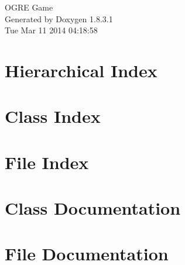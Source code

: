 \documentclass{book}
\begin{document}
\hypersetup{pageanchor=false,citecolor=blue}
\begin{titlepage}
\vspace*{7cm}
\begin{center}
{\Large O\-G\-R\-E Game }\\
\vspace*{1cm}
{\large Generated by Doxygen 1.8.3.1}\\
\vspace*{0.5cm}
{\small Tue Mar 11 2014 04:18:58}\\
\end{center}
\end{titlepage}
\clearemptydoublepage
{}
\tableofcontents
\clearemptydoublepage
{}
\hypersetup{pageanchor=true,citecolor=blue}
\chapter{Hierarchical Index}

\chapter{Class Index}

\chapter{File Index}

\chapter{Class Documentation}












\chapter{File Documentation}




















\printindex
\end{document}
